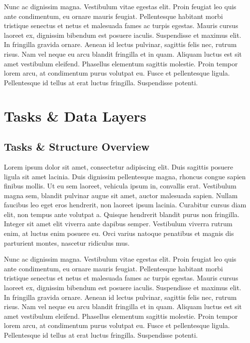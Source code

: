 \documentclass[
  letterpaper,
  DIV=11,
  numbers=noendperiod]{scrreprt}
\makeatletter
\newcommand*\pandocbounded[1]{%
  \sbox\pandoc@box{#1}%
  \Gscale@div\@tempa{\textheight}{\dimexpr\ht\pandoc@box+\dp\pandoc@box\relax}%
  \Gscale@div\@tempb{\linewidth}{\wd\pandoc@box}%
  \ifdim\@tempb\p@<\@tempa\p@\let\@tempa\@tempb\fi%
  \ifdim\@tempa\p@<\p@\scalebox{\@tempa}{\usebox\pandoc@box}%
  \else\usebox{\pandoc@box}%
  \fi%
}
\makeatother
\begin{document}
Nunc ac dignissim magna. Vestibulum vitae egestas elit. Proin feugiat
leo quis ante condimentum, eu ornare mauris feugiat. Pellentesque
habitant morbi tristique senectus et netus et malesuada fames ac turpis
egestas. Mauris cursus laoreet ex, dignissim bibendum est posuere
iaculis. Suspendisse et maximus elit. In fringilla gravida ornare.
Aenean id lectus pulvinar, sagittis felis nec, rutrum risus. Nam vel
neque eu arcu blandit fringilla et in quam. Aliquam luctus est sit amet
vestibulum eleifend. Phasellus elementum sagittis molestie. Proin tempor
lorem arcu, at condimentum purus volutpat eu. Fusce et pellentesque
ligula. Pellentesque id tellus at erat luctus fringilla. Suspendisse
potenti.

\part{Tasks \& Data Layers}

\chapter{Tasks \& Structure Overview}\label{tasks-structure-overview}

\pandocbounded{}

Lorem ipsum dolor sit amet, consectetur adipiscing elit. Duis sagittis
posuere ligula sit amet lacinia. Duis dignissim pellentesque magna,
rhoncus congue sapien finibus mollis. Ut eu sem laoreet, vehicula ipsum
in, convallis erat. Vestibulum magna sem, blandit pulvinar augue sit
amet, auctor malesuada sapien. Nullam faucibus leo eget eros hendrerit,
non laoreet ipsum lacinia. Curabitur cursus diam elit, non tempus ante
volutpat a. Quisque hendrerit blandit purus non fringilla. Integer sit
amet elit viverra ante dapibus semper. Vestibulum viverra rutrum enim,
at luctus enim posuere eu. Orci varius natoque penatibus et magnis dis
parturient montes, nascetur ridiculus mus.

Nunc ac dignissim magna. Vestibulum vitae egestas elit. Proin feugiat
leo quis ante condimentum, eu ornare mauris feugiat. Pellentesque
habitant morbi tristique senectus et netus et malesuada fames ac turpis
egestas. Mauris cursus laoreet ex, dignissim bibendum est posuere
iaculis. Suspendisse et maximus elit. In fringilla gravida ornare.
Aenean id lectus pulvinar, sagittis felis nec, rutrum risus. Nam vel
neque eu arcu blandit fringilla et in quam. Aliquam luctus est sit amet
vestibulum eleifend. Phasellus elementum sagittis molestie. Proin tempor
lorem arcu, at condimentum purus volutpat eu. Fusce et pellentesque
ligula. Pellentesque id tellus at erat luctus fringilla. Suspendisse
potenti.
\end{document}
